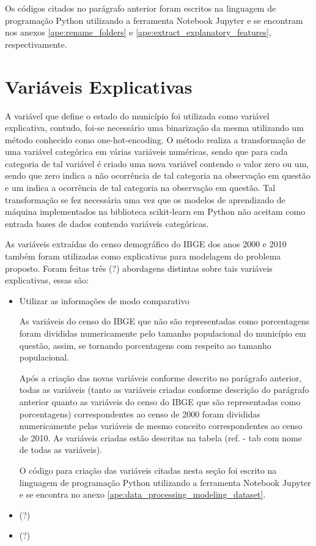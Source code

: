 Os códigos citados no parágrafo anterior foram escritos na linguagem de programação Python utilizando a ferramenta Notebook Jupyter e se encontram nos anexos \ref{ape:rename_folders} e \ref{ape:extract_explanatory_features}, respectivamente.

\section{Variáveis Explicativas}
\label{sec:variaveis_explicativas}

A variável que define o estado do município foi utilizada como variável explicativa, contudo, foi-se necessário uma binarização da mesma utilizando um método conhecido como one-hot-encoding. O método realiza a transformação de uma variável categórica em várias variáveis numéricas, sendo que para cada categoria de tal variável é criado uma nova variável contendo o valor zero ou um, sendo que zero indica a não ocorrência de tal categoria na observação em questão e um indica a ocorrência de tal categoria na observação em questão. Tal transformação se fez necessária uma vez que os modelos de aprendizado de máquina implementados na biblioteca scikit-learn em Python não aceitam como entrada bases de dados contendo variáveis categóricas.

As variáveis extraídas do censo demográfico do IBGE dos anos 2000 e 2010 também foram utilizadas como explicativas para modelagem do problema proposto. Foram feitas três (?) abordagens distintas sobre tais variáveis explicativas, essas são:

\begin{itemize}
\item Utilizar as informações de modo comparativo

As variáveis do censo do IBGE que não são representadas como porcentagens foram divididas numericamente pelo tamanho populacional do município em questão, assim, se tornando porcentagens com respeito ao tamanho populacional.

Após a criação das novas variáveis conforme descrito no parágrafo anterior, todas as variáveis (tanto as variáveis criadas conforme descrição do parágrafo anterior quanto as variáveis do censo do IBGE que são representadas como porcentagens) correspondentes ao censo de 2000 foram divididas numericamente pelas variáveis de mesmo conceito correspondentes ao censo de 2010. As variáveis criadas estão descritas na tabela (ref. - tab com nome de todas as variáveis).

O código para criação das variáveis citadas nesta seção foi escrito na linguagem de programação Python utilizando a ferramenta Notebook Jupyter e se encontra no anexo \ref{ape:data_processing_modeling_dataset}.

\item (?)
\item (?)

\end{itemize}

